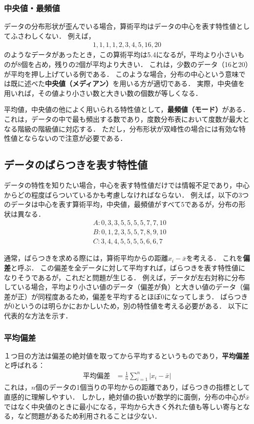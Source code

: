 \subsubsection*{中央値・最頻値}
%
データの分布形状が歪んでいる場合，算術平均はデータの中心を表す特性値としてふさわしくない．
%
例えば，
%
\begin{align*}
	1,1,1,1,2,3,4,5,16,20 
\end{align*}
%
のようなデータがあったとき，この算術平均は5.4になるが，平均より小さいものが8個を占め，残りの2個が平均より大きい．
%
これは，少数のデータ（16と20）が平均を押し上げている例である．
%
このような場合，分布の中心という意味では既に述べた\textbf{中央値（メディアン）}を用いる方が適切である．
%
実際，中央値を用いれば，その値より小さい数と大きい数の個数が等しくなる．
%

%
平均値，中央値の他によく用いられる特性値として，\textbf{最頻値（モード）}がある．
%
これは，データの中で最も頻出する数であり，度数分布表において度数が最大となる階級の階級値に対応する．
%
ただし，分布形状が双峰性の場合には有効な特性値とならないので注意が必要である．
%

\subsection{データのばらつきを表す特性値}
%
データの特性を知りたい場合，中心を表す特性値だけでは情報不足であり，中心からどの程度ばらついているかも考慮しなければならない．
%
例えば，以下の3つのデータは中心を表す算術平均，中央値，最頻値がすべて5であるが，分布の形状は異なる．
%
\begin{align*}
	&A: 0,3,3,5,5,5,5,7,7,10 \\
	&B: 0,1,2,3,5,5,7,8,9,10 \\
	&C: 3,4,4,5,5,5,5,6,6,7
\end{align*}
%

%
通常，ばらつきを求める際には，算術平均からの距離$ x_{i} - \bar{x} $を考える．
%
これを\textbf{偏差}と呼ぶ．
%
この偏差を全データに対して平均すれば，ばらつきを表す特性値になりそうであるが，これだと問題が生じる．
%
例えば，データが左右対称に分布している場合，平均より小さい値のデータ（偏差が負）と大きい値のデータ（偏差が正）が同程度あるため，偏差を平均するとほぼ0になってしまう．
%
ばらつきが0というのは明らかにおかしいため，別の特性値を考える必要がある．
%
以下に代表的な方法を示す．
%

\subsubsection*{平均偏差}
%
１つ目の方法は偏差の絶対値を取ってから平均するというものであり，\textbf{平均偏差}と呼ばれる：
%
\begin{align}
	平均偏差 &= \frac{1}{n} \sum_{i=1}^{n}|x_{i}-\bar{x}| 
	\label{eq:mean_deviation}
\end{align}
%
%
これは，$ n $個のデータの1個当りの平均からの距離であり，ばらつきの指標として直感的に理解しやすい．
%
しかし，絶対値の扱いが数学的に面倒，分布の中心が$ \bar{x} $ではなく中央値のときに最小になる，平均から大きく外れた値も等しい寄与となる，など問題があるため利用されることは少ない．
%


